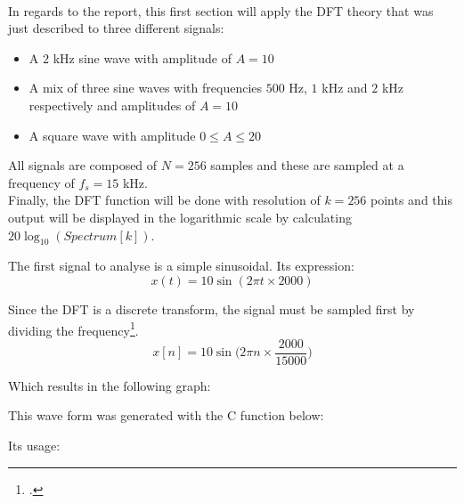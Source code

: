 \newpage
\paragraph{}
In regards to the report, this first section will apply the DFT theory that was just described to three different signals:
\begin{itemize}
\item A $2$ kHz sine wave with amplitude of $A = 10$
\item A mix of three sine waves with frequencies $500$ Hz, $1$ kHz and $2$ kHz respectively and amplitudes of $A = 10$
\item A square wave with amplitude $0 \leq A \leq 20$
\end{itemize}

All signals are composed of $N = 256$ samples and these are sampled at a frequency of $f_s = 15$ kHz.\\

Finally, the DFT function will be done with resolution of $k = 256$ points and this output will be displayed in the logarithmic scale by calculating $20\log_{10}(Spectrum[k])$.


The first signal to analyse is a simple sinusoidal. Its expression:
\[x(t) = 10\sin(2\pi t\times 2000)\] 

Since the DFT is a discrete transform, the signal must be sampled first by dividing the frequency\footcite{book1_pp55_56}.
\[x[n] = 10\sin\Big(2\pi n\times\frac{2000}{15000}\Big)\]

Which results in the following graph:

This wave form was generated with the C function below:


\newpage
Its usage:


